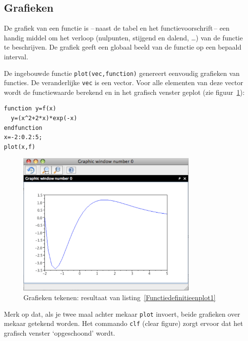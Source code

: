 \subsection{Grafieken}
\label{sec:grafiek}
De grafiek van een functie is --\,naast de tabel en het functievoorschrift\,-- een handig middel om het verloop (nulpunten, stijgend en dalend, \dots) van de functie te beschrijven. De grafiek geeft een globaal beeld van de functie op een bepaald interval.

De ingebouwde functie \verb+plot(vec,function)+ genereert eenvoudig grafieken van functies. De veranderlijke \verb+vec+ is een vector. Voor alle elementen van deze vector wordt de functiewaarde berekend en in het grafisch venster geplot (zie figuur~\ref{figg:functie1}):

\begin{lstlisting}[caption={Functiedefinitie en plot}, label={Functiedefinitieenplot1}]	
function y=f(x)
  y=(x^2+2*x)*exp(-x)
endfunction
x=-2:0.2:5;
plot(x,f)
\end{lstlisting}

\begin{figure}[h!t]
   \begin{center}
  \includegraphics[width=0.8\textwidth]{figuren/scilab/08grafiek.pdf}
  \caption{Grafieken tekenen: resultaat van listing~\ref{Functiedefinitieenplot1}}
	\label{figg:functie1}
	\end{center}
\end{figure}


Merk op dat, als je twee maal achter mekaar \verb+plot+ invoert, beide grafieken over mekaar getekend worden.
Het commando \verb+clf+ (clear figure) zorgt ervoor dat het grafisch venster `opgeschoond' wordt. 

